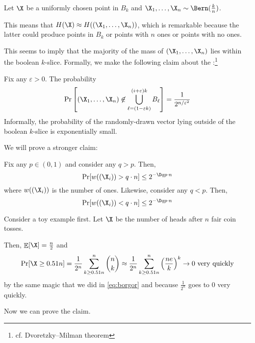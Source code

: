 \documentclass[class=co432,notes,tikz]{agony}
\DeclareMathOperator*{\E}{\mathbb{E}}
\begin{document}
Let $\X$ be a uniformly chosen point in $B_k$
and $\X_1,\dotsc,\X_n \sim \Bern(\frac{k}{n})$.

This means that $H(\X) \approx H((\X_1,\dotsc,\X_n))$,
which is remarkable because the latter could produce points in $B_k$
or points with $n$ ones or points with no ones.

This seems to imply that the majority of the mass of $(\X_1,\dotsc,\X_n)$
lies within the boolean $k$-slice.
Formally, we make the following claim about the
:\footnote{cf. Dvoretzky--Milman theorem}

\begin{prop}
  Fix any $\varepsilon > 0$. The probability
  \[ \Pr\qty[(\X_1,\dotsc,\X_n) \not\in \bigcup_{\ell = (1-\varepsilon k)}^{(i+\varepsilon)k}B_\ell] = \frac{1}{2^{n/\varepsilon^2}} \]
  Informally, the probability of the randomly-drawn vector lying outside of
  the boolean $k$-slice is exponentially small.
\end{prop}

We will prove a stronger claim:

\begin{claim}
  Fix any $p \in (0,1)$ and consider any $q > p$. Then,
  \[ \Pr[w((\X_i)) > q \cdot n] \leq 2^{-\D q p \cdot n} \]
  where $w((\X_i))$ is the number of ones. Likewise, consider any $q < p$. Then,
  \[ \Pr[w((\X_i)) < q \cdot n] \leq 2^{-\D q p \cdot n} \]
\end{claim}

Consider a toy example first.
Let $\X$ be the number of heads after $n$ fair coin tosses.

Then, $\E[\X] = \frac{n}{2}$ and
\[
  \Pr[\X \geq 0.51n]
  = \frac{1}{2^n}\sum_{k\geq0.51n}^n\binom{n}{k}
  \approx \frac{1}{2^n}\sum_{k\geq0.51n}^n\qty(\frac{ne}{k})^k
  \to 0 \text{ very quickly}
\]
by the same magic that we did in \cref{eq:borgor}
and because $\frac{1}{2^n}$ goes to 0 very quickly.

Now we can prove the claim.
\end{document}
